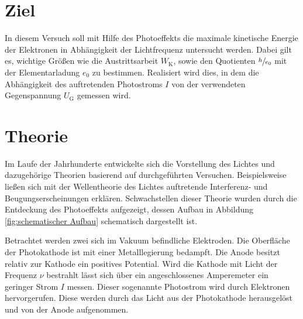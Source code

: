 \section*{Ziel}

In diesem Versuch soll mit Hilfe des Photoeffekts die maximale kinetische Energie der Elektronen in Abhängigkeit der Lichtfrequenz untersucht werden.
Dabei gilt es, wichtige Größen wie die Austrittsarbeit $W_\mathup{K}$, sowie den Quotienten $\sfrac{h}{e_0}$ mit der Elementarladung $e_0$ zu bestimmen. 
Realisiert wird dies, in dem die Abhängigkeit des auftretenden Photostroms $I$ von der verwendeten Gegenspannung $U_\mathup{G}$ gemessen wird.

\section{Theorie}
\label{sec:Theorie}

Im Laufe der Jahrhunderte entwickelte sich die Vorstellung des Lichtes und dazugehörige Theorien basierend auf durchgeführten Versuchen.
Beispielsweise ließen sich mit der Wellentheorie des Lichtes auftretende Interferenz- und Beugungserscheinungen erklären. 
Schwachstellen dieser Theorie wurden durch die Entdeckung des Photoeffekts aufgezeigt, dessen Aufbau in Abbildung \ref{fig:schematischer Aufbau}  schematisch dargestellt ist.

Betrachtet werden zwei sich im Vakuum befindliche Elektroden. 
Die Oberfläche der Photokathode ist mit einer Metalllegierung bedampft. 
Die Anode besitzt relativ zur Kathode ein positives Potential.
 Wird die Kathode mit Licht der Frequenz $\nu$ bestrahlt lässt sich über ein angeschlossenes Amperemeter ein geringer Strom $I$ messen. Dieser sogenannte Photostrom wird durch Elektronen hervorgerufen.
 Diese werden durch das Licht aus der Photokathode herausgelöst und von der Anode aufgenommen. 
 
